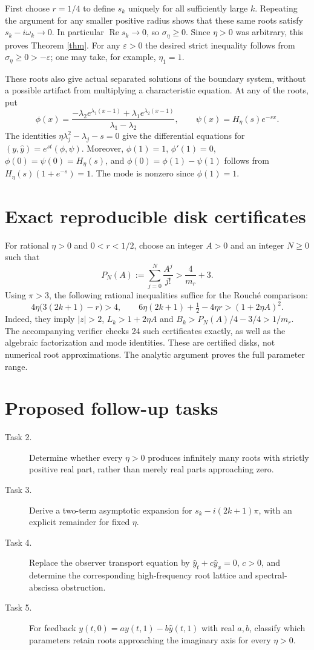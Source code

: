 \documentclass[11pt]{article}
\newcommand{\Ree}{\operatorname{Re}}
\begin{document}
First choose $r=1/4$ to define $s_k$ uniquely for all sufficiently large
$k$. Repeating the argument for any smaller positive radius shows that
these same roots satisfy $s_k-i\omega_k\to0$. In particular
$\Ree s_k\to0$, so $\sigma_\eta\geq0$. Since $\eta>0$ was arbitrary,
this proves Theorem \ref{thm}. For any $\varepsilon>0$ the desired
strict inequality follows from $\sigma_\eta\geq0>-\varepsilon$;
one may take, for example, $\eta_1=1$.

These roots also give actual separated solutions of the boundary system,
without a possible artifact from multiplying a characteristic equation.
At any of the roots, put
\[
 \phi(x)=\frac{-\lambda_2e^{\lambda_1(x-1)}
                         +\lambda_1e^{\lambda_2(x-1)}}{\lambda_1-\lambda_2},
 \qquad \psi(x)=H_\eta(s)e^{-sx}.
\]
The identities $\eta\lambda_j^2-\lambda_j-s=0$ give the differential
equations for $(y,\widehat y)=e^{st}(\phi,\psi)$. Moreover,
$\phi(1)=1$, $\phi'(1)=0$, $\phi(0)=\psi(0)=H_\eta(s)$, and
$\phi(0)=\phi(1)-\psi(1)$ follows from $H_\eta(s)(1+e^{-s})=1$.
The mode is nonzero since $\phi(1)=1$.

\section*{Exact reproducible disk certificates}
For rational $\eta>0$ and $0<r<1/2$, choose an integer $A>0$ and an
integer $N\geq0$ such that
\[
 P_N(A):=\sum_{j=0}^N\frac{A^j}{j!}>\frac4{m_r}+3.
\]
Using $\pi>3$, the following rational inequalities suffice for the
Rouch\'e comparison:
\[
 4\eta\bigl(3(2k+1)-r\bigr)>4,\qquad
 6\eta(2k+1)+\tfrac12-4\eta r>(1+2\eta A)^2.
\]
Indeed, they imply $|z|>2$, $L_k>1+2\eta A$ and
$B_k> P_N(A)/4-3/4>1/m_r$. The accompanying verifier checks
24 such certificates exactly, as well as the algebraic factorization
and mode identities. These are certified disks, not numerical root
approximations. The analytic argument proves the full parameter range.

\section*{Proposed follow-up tasks}
\begin{description}
\item[Task 2.] Determine whether every $\eta>0$ produces infinitely many
roots with strictly positive real part, rather than merely real parts
approaching zero.
\item[Task 3.] Derive a two-term asymptotic expansion for
$s_k-i(2k+1)\pi$, with an explicit remainder for fixed $\eta$.
\item[Task 4.] Replace the observer transport equation by
$\widehat y_t+c\widehat y_x=0$, $c>0$, and determine the corresponding
high-frequency root lattice and spectral-abscissa obstruction.
\item[Task 5.] For feedback $y(t,0)=a y(t,1)-b\widehat y(t,1)$ with
real $a,b$, classify which parameters retain roots approaching the
imaginary axis for every $\eta>0$.
\end{description}
\end{document}
